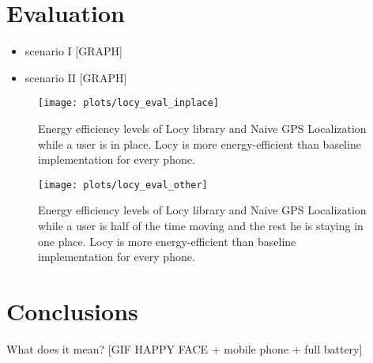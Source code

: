 \documentclass[a2,landscape]{a0poster}
\begin{document}
\mbox{}\framebreak
\section*{Evaluation}
\begin{itemize}
   \item scenario I [GRAPH]
   \item scenario II [GRAPH]
  \end{itemize}
  
\begin{figure}[H]
\texttt{[image: plots/locy\_eval\_inplace]}
\caption{\label{p:locy_eval_place} Energy efficiency levels of Locy library and Naive GPS Localization while a user is in place. Locy is more energy-efficient than baseline implementation for every phone.}
\end{figure}


\begin{figure}[H]
\texttt{[image: plots/locy\_eval\_other]}
\caption{\label{p:locy_eval_other} Energy efficiency levels of Locy library and Naive GPS Localization while a user is half of the time moving and the rest he is staying in one place. Locy is more energy-efficient than baseline implementation for every phone. }
\end{figure}



\section*{Conclusions}
What does it mean?
[GIF HAPPY FACE + mobile phone + full battery]
\end{document}
